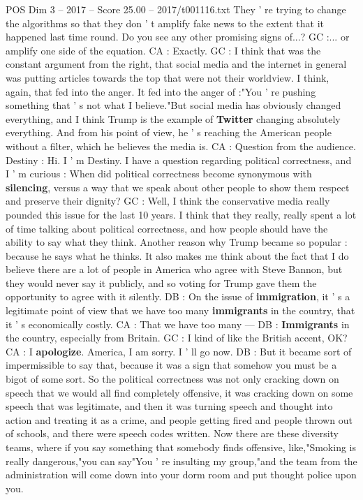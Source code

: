 \begin{textsample}{POS Dim 3 – 2017 – Score 25.00 – 2017/t001116.txt}
They ' re trying to change the algorithms so that they don ' t amplify fake news to the extent that it happened last time round.
Do you see any other promising signs of...?
GC :... or amplify one side of the equation.
CA : Exactly.
GC : I think that was the constant argument from the right, that social media and the internet in general was putting articles towards the top that were not their worldview.
I think, again, that fed into the anger.
It fed into the anger of :"You ' re pushing something that ' s not what I believe."But social media has obviously changed everything, and I think Trump is the example of \textbf{Twitter} changing absolutely everything.
And from his point of view, he ' s reaching the American people without a filter, which he believes the media is.
CA : Question from the audience.
Destiny : Hi.
I ' m Destiny.
I have a question regarding political correctness, and I ' m curious : When did political correctness become synonymous with \textbf{silencing}, versus a way that we speak about other people to show them respect and preserve their dignity?
GC : Well, I think the conservative media really pounded this issue for the last 10 years.
I think that they really, really spent a lot of time talking about political correctness, and how people should have the ability to say what they think.
Another reason why Trump became so popular : because he says what he thinks.
It also makes me think about the fact that I do believe there are a lot of people in America who agree with Steve Bannon, but they would never say it publicly, and so voting for Trump gave them the opportunity to agree with it silently.
DB : On the issue of \textbf{immigration}, it ' s a legitimate point of view that we have too many \textbf{immigrants} in the country, that it ' s economically costly.
CA : That we have too many — DB : \textbf{Immigrants} in the country, especially from Britain.
GC : I kind of like the British accent, OK?
CA : I \textbf{apologize}.
America, I am sorry.
I ' ll go now.
DB : But it became sort of impermissible to say that, because it was a sign that somehow you must be a bigot of some sort.
So the political correctness was not only cracking down on speech that we would all find completely offensive, it was cracking down on some speech that was legitimate, and then it was turning speech and thought into action and treating it as a crime, and people getting fired and people thrown out of schools, and there were speech codes written.
Now there are these diversity teams, where if you say something that somebody finds offensive, like,"Smoking is really dangerous,"you can say"You ' re insulting my group,"and the team from the administration will come down into your dorm room and put thought police upon you.

\end{textsample}
